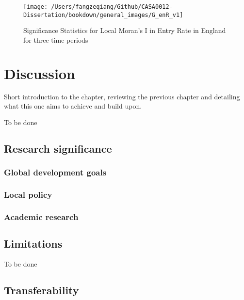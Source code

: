 \documentclass[
  12pt,
  oneside]{book}
\begin{document}
\begin{figure}
\texttt{[image: /Users/fangzeqiang/Github/CASA0012-Dissertation/bookdown/general\_images/G\_enR\_v1]} \caption{Significance Statistics for Local Moran's I in Entry Rate in England for three time periods}\label{fig:fig-Gi-entry-rate}
\end{figure}

\hypertarget{disc}{%
\chapter{Discussion}\label{disc}}

Short introduction to the chapter, reviewing the previous chapter and detailing what this one aims to achieve and build upon.

To be done

\hypertarget{research-significance}{%
\section{Research significance}\label{research-significance}}

\hypertarget{global-development-goals}{%
\subsection{Global development goals}\label{global-development-goals}}

\hypertarget{local-policy}{%
\subsection{Local policy}\label{local-policy}}

\hypertarget{academic-research}{%
\subsection{Academic research}\label{academic-research}}

\hypertarget{limitations-1}{%
\section{Limitations}\label{limitations-1}}

To be done

\hypertarget{transferability}{%
\section{Transferability}\label{transferability}}
\end{document}
